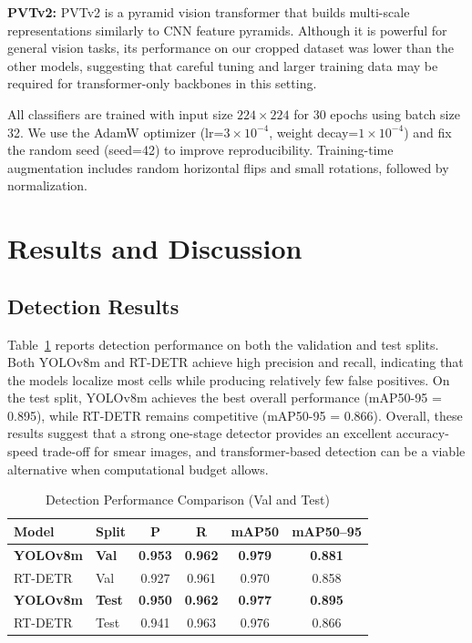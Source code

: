 \documentclass[conference]{IEEEtran}
\begin{document}
\textbf{PVTv2:} PVTv2 is a pyramid vision transformer that builds multi-scale representations similarly to CNN feature pyramids. Although it is powerful for general vision tasks, its performance on our cropped dataset was lower than the other models, suggesting that careful tuning and larger training data may be required for transformer-only backbones in this setting.

All classifiers are trained with input size $224 \times 224$ for 30 epochs using batch size 32. We use the AdamW optimizer (lr=$3 \times 10^{-4}$, weight decay=$1 \times 10^{-4}$) and fix the random seed (seed=42) to improve reproducibility. Training-time augmentation includes random horizontal flips and small rotations, followed by normalization.

\section{Results and Discussion}

\subsection{Detection Results}

Table~\ref{tab:detection} reports detection performance on both the validation and test splits. Both YOLOv8m and RT-DETR achieve high precision and recall, indicating that the models localize most cells while producing relatively few false positives. On the test split, YOLOv8m achieves the best overall performance (mAP50-95 = 0.895), while RT-DETR remains competitive (mAP50-95 = 0.866). Overall, these results suggest that a strong one-stage detector provides an excellent accuracy-speed trade-off for smear images, and transformer-based detection can be a viable alternative when computational budget allows.

\begin{table}[htbp]
\caption{Detection Performance Comparison (Val and Test)}
\label{tab:detection}
\centering
\begin{tabular}{l l c c c c}
\toprule
\textbf{Model} & \textbf{Split} & \textbf{P} & \textbf{R} & \textbf{mAP50} & \textbf{mAP50--95} \\
\midrule
\textbf{YOLOv8m} & \textbf{Val} & \textbf{0.953} & \textbf{0.962} & \textbf{0.979} & \textbf{0.881} \\
RT-DETR & Val & 0.927 & 0.961 & 0.970 & 0.858 \\
\textbf{YOLOv8m} & \textbf{Test} & \textbf{0.950} & \textbf{0.962} & \textbf{0.977} & \textbf{0.895} \\
RT-DETR & Test & 0.941 & 0.963 & 0.976 & 0.866 \\
\bottomrule
\end{tabular}
\end{table}
\end{document}

